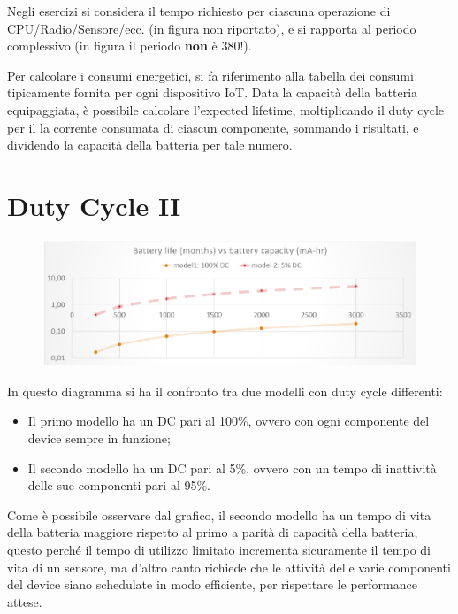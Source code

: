 Negli esercizi si considera il tempo richiesto per ciascuna operazione di CPU/Radio/Sensore/ecc. (in figura non riportato), e si rapporta al periodo complessivo (in figura il periodo \textbf{non} è 380!).

Per calcolare i consumi energetici, si fa riferimento alla tabella dei consumi tipicamente fornita per ogni dispositivo IoT. Data la capacità della batteria equipaggiata, è possibile calcolare l'expected lifetime, moltiplicando il duty cycle per il la corrente consumata di ciascun componente, sommando i risultati, e dividendo la capacità della batteria per tale numero.



\section{Duty Cycle II}

\begin{figure}[htbp]
   \centering
   \includegraphics{images/questions/Schermata del 2023-10-19 15-44-53.png}
   \label{fig:dom13}
\end{figure}

{\ns In questo diagramma si ha il confronto tra due modelli con duty cycle differenti:
\begin{itemize}
\item Il primo modello ha un DC pari al 100\%, ovvero con ogni componente del device sempre in funzione;
\item Il secondo modello ha un DC pari al 5\%, ovvero con un tempo di inattività delle sue componenti pari al 95\%.
\end{itemize}}

Come è possibile osservare dal grafico, il secondo modello ha un tempo di vita della batteria maggiore rispetto al primo a parità di capacità della batteria, questo perché il tempo di utilizzo limitato incrementa sicuramente il tempo di vita di un sensore, ma d'altro canto richiede che le attività delle varie componenti del device siano schedulate in modo efficiente, per rispettare le performance attese.

